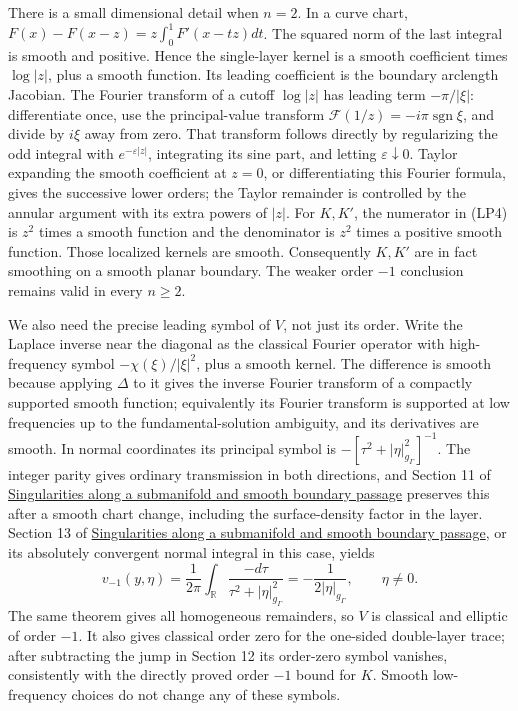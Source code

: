 \documentclass[
  11pt,
]{article}
\begin{document}
There is a small dimensional detail when \(n=2\). In a curve chart,
\(F(x)-F(x-z)=z\int_0^1F'(x-tz)dt\). The squared norm of the last
integral is smooth and positive. Hence the single-layer kernel is a
smooth coefficient times \(\log|z|\), plus a smooth function. Its
leading coefficient is the boundary arclength Jacobian. The Fourier
transform of a cutoff \(\log|z|\) has leading term \(-\pi/|\xi|\):
differentiate once, use the principal-value transform
\(\mathcal F(1/z)=-i\pi\operatorname{sgn}\xi\), and divide by \(i\xi\)
away from zero. That transform follows directly by regularizing the odd
integral with \(e^{-\varepsilon|z|}\), integrating its sine part, and
letting \(\varepsilon\downarrow0\). Taylor expanding the smooth
coefficient at \(z=0\), or differentiating this Fourier formula, gives
the successive lower orders; the Taylor remainder is controlled by the
annular argument with its extra powers of \(|z|\). For \(K,K'\), the
numerator in (LP4) is \(z^2\) times a smooth function and the
denominator is \(z^2\) times a positive smooth function. Those localized
kernels are smooth. Consequently \(K,K'\) are in fact smoothing on a
smooth planar boundary. The weaker order \(-1\) conclusion remains valid
in every \(n\ge2\).

We also need the precise leading symbol of \(V\), not just its order.
Write the Laplace inverse near the diagonal as the classical Fourier
operator with high-frequency symbol \(-\chi(\xi)/|\xi|^2\), plus a
smooth kernel. The difference is smooth because applying \(\Delta\) to
it gives the inverse Fourier transform of a compactly supported smooth
function; equivalently its Fourier transform is supported at low
frequencies up to the fundamental-solution ambiguity, and its
derivatives are smooth. In normal coordinates its principal symbol is
\(-[\tau^2+|\eta|_{g_\Gamma}^2]^{-1}\). The integer parity gives
ordinary transmission in both directions, and Section 11 of
\href{conormal-transmission.pdf}{Singularities along a submanifold and
smooth boundary passage} preserves this after a smooth chart change,
including the surface-density factor in the layer. Section 13 of
\href{conormal-transmission.pdf}{Singularities along a submanifold and
smooth boundary passage}, or its absolutely convergent normal integral
in this case, yields \[
 v_{-1}(y,\eta)=\frac1{2\pi}\int_{\mathbb R}
 \frac{-d\tau}{\tau^2+|\eta|_{g_\Gamma}^2}
 =-\frac1{2|\eta|_{g_\Gamma}},\qquad\eta\ne0.
 \tag{LP7}
\] The same theorem gives all homogeneous remainders, so \(V\) is
classical and elliptic of order \(-1\). It also gives classical order
zero for the one-sided double-layer trace; after subtracting the jump in
Section 12 its order-zero symbol vanishes, consistently with the
directly proved order \(-1\) bound for \(K\). Smooth low-frequency
choices do not change any of these symbols.
\end{document}
